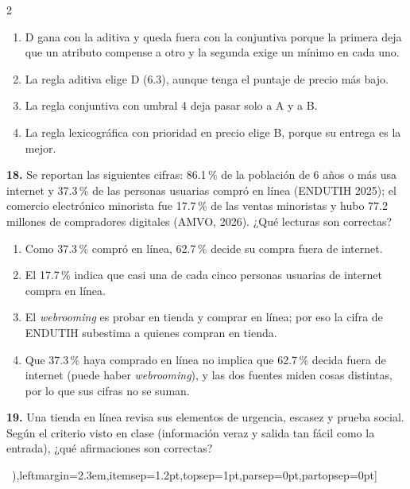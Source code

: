 \documentclass[10pt,letterpaper]{article}
\newcommand{\cas}{\framebox[1.0em]{\rule{0pt}{1.05ex}}}
\begin{document}
\begin{multicols}{2}
\begin{minipage}[t]{\columnwidth}
\begin{enumerate}[label=\cas\ \alph*),leftmargin=2.3em,itemsep=1.2pt,topsep=1pt,parsep=0pt,partopsep=0pt]
\item D gana con la aditiva y queda fuera con la conjuntiva porque la primera deja que un atributo compense a otro y la segunda exige un mínimo en cada uno.
\item La regla aditiva elige D (6.3), aunque tenga el puntaje de precio más bajo.
\item La regla conjuntiva con umbral 4 deja pasar solo a A y a B.
\item La regla lexicográfica con prioridad en precio elige B, porque su entrega es la mejor.
\end{enumerate}\end{minipage}\par\vspace{3pt}
\begin{minipage}[t]{\columnwidth}\noindent\textbf{18.} Se reportan las siguientes cifras: 86.1\,\% de la población de 6 años o más usa internet y 37.3\,\% de las personas usuarias compró en línea (ENDUTIH 2025); el comercio electrónico minorista fue 17.7\,\% de las ventas minoristas y hubo 77.2 millones de compradores digitales (AMVO, 2026). ¿Qué lecturas son correctas?
\vspace{1pt}\begin{enumerate}[label=\cas\ \alph*),leftmargin=2.3em,itemsep=1.2pt,topsep=1pt,parsep=0pt,partopsep=0pt]
\item Como 37.3\,\% compró en línea, 62.7\,\% decide su compra fuera de internet.
\item El 17.7\,\% indica que casi una de cada cinco personas usuarias de internet compra en línea.
\item El \textit{webrooming} es probar en tienda y comprar en línea; por eso la cifra de ENDUTIH subestima a quienes compran en tienda.
\item Que 37.3\,\% haya comprado en línea no implica que 62.7\,\% decida fuera de internet (puede haber \textit{webrooming}), y las dos fuentes miden cosas distintas, por lo que sus cifras no se suman.
\end{enumerate}\end{minipage}\par\vspace{3pt}
\begin{minipage}[t]{\columnwidth}\noindent\textbf{19.} Una tienda en línea revisa sus elementos de urgencia, escasez y prueba social. Según el criterio visto en clase (información veraz y salida tan fácil como la entrada), ¿qué afirmaciones son correctas?
\vspace{1pt}\begin{enumerate}[label=\cas\ \alph*),leftmargin=2.3em,itemsep=1.2pt,topsep=1pt,parsep=0pt,partopsep=0pt]

\end{enumerate}
\end{minipage}
\end{multicols}
\end{document}
